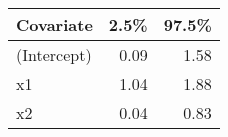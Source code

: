 \begin{table}[ht]
\centering
\begin{tabular}{lrr}
  \hline
Covariate & 2.5\% & 97.5\% \\ 
  \hline
(Intercept) & 0.09 & 1.58 \\ 
  x1 & 1.04 & 1.88 \\ 
  x2 & 0.04 & 0.83 \\ 
   \hline
\end{tabular}
\end{table}
